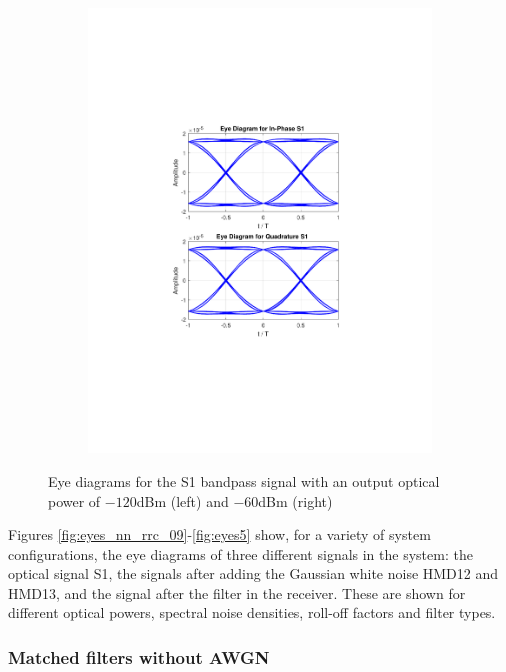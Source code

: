 \begin{figure}[H]
\begin{subfigure}{.5\textwidth}
		\includegraphics[clip, trim=5cm 7cm 5cm 7cm, width=\textwidth]{./sdf/m_qam_system/figures/eye60db09ro.pdf}
	\end{subfigure}
	\caption{Eye diagrams for the S1 bandpass signal with an output optical power of $-120$dBm (left) and $-60$dBm (right)}
	\label{fig:eyespower}
\end{figure}

Figures \ref{fig:eyes_nn_rrc_09}-\ref{fig:eyes5} show, for a variety of system configurations, the eye diagrams of three different signals in the system: the optical signal S1, the signals after adding the Gaussian white noise HMD12 and HMD13, and the signal after the filter in the receiver. These are shown for different optical powers, spectral noise densities, roll-off factors and filter types.

\subsubsection*{Matched filters without AWGN}

